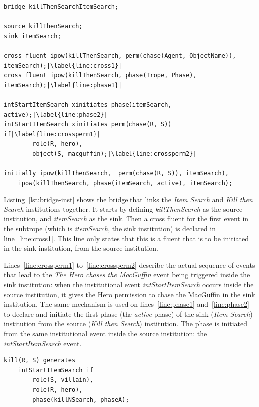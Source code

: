 \documentclass[11pt]{report}
\begin{document}
\begin{lstlisting}[caption={Bridge for the \emph{Item Search} and
\emph{Kill then Search} tropes}, label={lst:bridge-inst},escapechar=|]
bridge killThenSearchItemSearch;

source killThenSearch;
sink itemSearch;

cross fluent ipow(killThenSearch, perm(chase(Agent, ObjectName)), itemSearch);|\label{line:cross1}|
cross fluent ipow(killThenSearch, phase(Trope, Phase), itemSearch);|\label{line:phase1}|

intStartItemSearch xinitiates phase(itemSearch, active);|\label{line:phase2}|
intStartItemSearch xinitiates perm(chase(R, S)) if|\label{line:crossperm1}|
        role(R, hero),
        object(S, macguffin);|\label{line:crossperm2}|

initially ipow(killThenSearch,  perm(chase(R, S)), itemSearch),
    ipow(killThenSearch, phase(itemSearch, active), itemSearch);
\end{lstlisting}

Listing~\ref{lst:bridge-inst} shows the bridge that links the
\emph{Item Search} and \emph{Kill then Search} institutions together. It starts
by defining \emph{killThenSearch} as the source institution, and
\emph{itemSearch} as the sink. Then a cross fluent for the first event in the
subtrope (which is \emph{itemSearch}, the sink institution) is declared in
line~\ref{line:cross1}. This line only states that this is a fluent that is to
be initiated in the sink institution, from the source institution.

Lines~\ref{line:crossperm1} to~\ref{line:crossperm2} describe the actual
sequence of events that lead to the \emph{The Hero chases the MacGuffin} event
being triggered inside the sink institution: when the institutional event
\emph{intStartItemSearch} occurs inside the source institution, it gives the
Hero permission to chase the MacGuffin in the sink institution. The same
mechanism is used on lines~\ref{line:phase1} and~\ref{line:phase2} to declare
and initiate the first phase (the \emph{active} phase) of the sink (\emph{Item
  Search}) institution from the source (\emph{Kill then Search}) institution.
The phase is initiated from the same institutional event inside the source
institution: the \emph{intStartItemSearch} event.

\begin{lstlisting}[label={lst:bridge-source}, caption={The generation event for
the final action in the \emph{Kill then Search} source institution}]
kill(R, S) generates
    intStartItemSearch if
        role(S, villain),
        role(R, hero),
        phase(killNSearch, phaseA);
\end{lstlisting}
\end{document}
